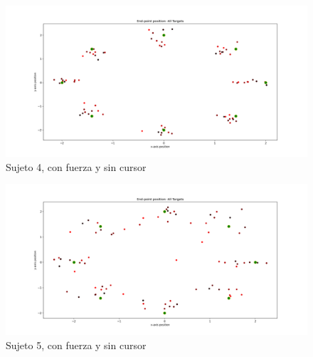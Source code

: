 \documentclass[a4paper,11pt, oneside]{book}
\begin{document}
\begin{figure}[H]
	\includegraphics[width=\linewidth]{sujeto4/force_no_cursor/trayectorias_puntos}
	\caption{Sujeto 4, con  fuerza y sin cursor}
	\label{4-4-1}
\end{figure}
\begin{figure}[H]
	\includegraphics[width=\linewidth]{sujeto5/force_no_cursor/trayectorias_puntos}
	\caption{Sujeto 5, con  fuerza y sin cursor}
	\label{5-4-1}
\end{figure}
\end{document}
